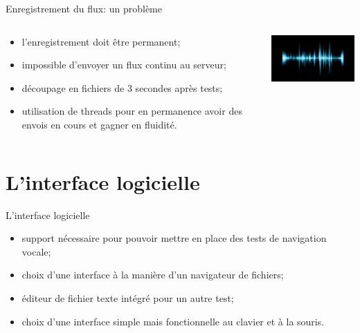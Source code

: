 \documentclass{beamer}
\begin{document}
\begin{frame}{Enregistrement du flux: un problème}

	
	\begin{columns}[c]
	
	\begin{column}{5cm}
	\begin{itemize}
		\item l'enregistrement doit être permanent;
		\item impossible d'envoyer un flux continu au serveur;
		\item découpage en fichiers de 3 secondes après tests;
		\item utilisation de threads pour en permanence avoir des envois en cours et gagner en fluidité.
	\end{itemize}
  	\end{column}
	\begin{column}{5cm}
		\includegraphics[width=5cm]{reconnaissance-vocale}
  	\end{column}
	
	\end{columns}

\end{frame}

	\section{L'interface logicielle}
	
\begin{frame}{L'interface logicielle}

	\begin{itemize}
		\item support nécessaire pour pouvoir mettre en place des tests de navigation vocale;
		\item choix d'une interface à la manière d'un navigateur de fichiers;
		\item éditeur de fichier texte intégré pour un autre test;
		\item choix d'une interface simple mais fonctionnelle au clavier et à la souris.
	\end{itemize}
	
\end{frame}
\end{document}
